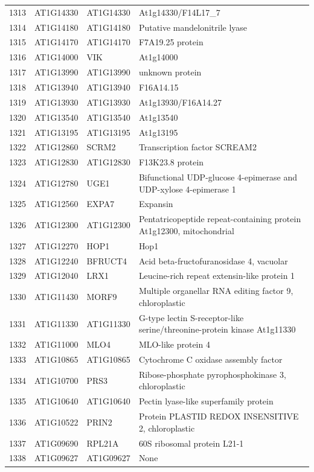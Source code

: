 \documentclass[11pt]{article}
\begin{document}
\begin{center}
\begin{tabular}{rlll}
1313 & AT1G14330 & AT1G14330 & At1g14330/F14L17\_7\\
1314 & AT1G14180 & AT1G14180 & Putative mandelonitrile lyase\\
1315 & AT1G14170 & AT1G14170 & F7A19.25 protein\\
1316 & AT1G14000 & VIK & At1g14000\\
1317 & AT1G13990 & AT1G13990 & unknown protein\\
1318 & AT1G13940 & AT1G13940 & F16A14.15\\
1319 & AT1G13930 & AT1G13930 & At1g13930/F16A14.27\\
1320 & AT1G13540 & AT1G13540 & At1g13540\\
1321 & AT1G13195 & AT1G13195 & At1g13195\\
1322 & AT1G12860 & SCRM2 & Transcription factor SCREAM2\\
1323 & AT1G12830 & AT1G12830 & F13K23.8 protein\\
1324 & AT1G12780 & UGE1 & Bifunctional UDP-glucose 4-epimerase and UDP-xylose 4-epimerase 1\\
1325 & AT1G12560 & EXPA7 & Expansin\\
1326 & AT1G12300 & AT1G12300 & Pentatricopeptide repeat-containing protein At1g12300, mitochondrial\\
1327 & AT1G12270 & HOP1 & Hop1\\
1328 & AT1G12240 & BFRUCT4 & Acid beta-fructofuranosidase 4, vacuolar\\
1329 & AT1G12040 & LRX1 & Leucine-rich repeat extensin-like protein 1\\
1330 & AT1G11430 & MORF9 & Multiple organellar RNA editing factor 9, chloroplastic\\
1331 & AT1G11330 & AT1G11330 & G-type lectin S-receptor-like serine/threonine-protein kinase At1g11330\\
1332 & AT1G11000 & MLO4 & MLO-like protein 4\\
1333 & AT1G10865 & AT1G10865 & Cytochrome C oxidase assembly factor\\
1334 & AT1G10700 & PRS3 & Ribose-phosphate pyrophosphokinase 3, chloroplastic\\
1335 & AT1G10640 & AT1G10640 & Pectin lyase-like superfamily protein\\
1336 & AT1G10522 & PRIN2 & Protein PLASTID REDOX INSENSITIVE 2, chloroplastic\\
1337 & AT1G09690 & RPL21A & 60S ribosomal protein L21-1\\
1338 & AT1G09627 & AT1G09627 & None\\

\end{tabular}
\end{center}
\end{document}
